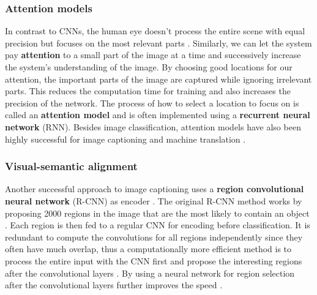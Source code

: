 \subsubsection{Attention models}



In contrast to CNNs, the human eye doesn't process the entire scene with equal precision but focuses on the most relevant parts \cite{DeepMindAttention}.
Similarly, we can let the system pay \textbf{attention} to a small part of the image at a time and successively increase the system's understanding of the image.
By choosing good locations for our attention, the important parts of the image are captured while ignoring irrelevant parts.
This reduces the computation time for training and also increases the precision of the network. The process of how to select a location to focus on is called an \textbf{attention model} and is often implemented using a \textbf{recurrent neural network} (RNN). Besides image classification, attention models have also been highly successful for image captioning \cite{AttendAndTell} and machine translation \cite{machine_translation_attention}.

\subsubsection{Visual-semantic alignment}


Another successful approach to image captioning uses a \textbf{region convolutional neural network} (R-CNN) as encoder \cite{VisualSemanticAlignment}.
The original R-CNN method works by proposing 2000 regions in the image that are the most likely to contain an object \cite{RCNN}. Each region is then fed to a regular CNN for encoding before classification.
It is redundant to compute the convolutions for all regions independently since they often have much overlap, thus a computationally more efficient method is to process the entire input with the CNN first and propose the interesting regions after the convolutional layers \cite{FastRCNN}.
By using a neural network for region selection after the convolutional layers further improves the speed \cite{FasterRCNN}.


